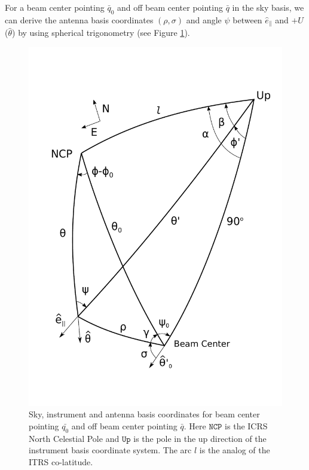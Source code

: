 \documentclass[a4paper,fleqn]{cas-dc}\sloppy
\newcommand{\co}{\mathbin{\|}}
\begin{document}
	For a beam center pointing $\bar{q}_0$ and off beam center pointing $\bar{q}$ in the sky basis, we can derive the antenna basis coordinates $(\rho,\sigma)$ and angle $\psi$ between $\hat{e}_{\co}$ and $+U$ ($\hat{\theta}$) by using spherical trigonometry (see Figure \ref{fig::figure10}). 
	
	\begin{figure}
		\centering
		\includegraphics[width=1.0\linewidth]{figures/Figure10.pdf}
		\caption{Sky, instrument and antenna basis coordinates for beam center pointing $\bar{q_0}$ and off beam center pointing $\bar{q}$. Here $\mathrm{\texttt{NCP}}$ is the ICRS North Celestial Pole and $\mathrm{\texttt{Up}}$ is the pole in the up direction of the instrument basis coordinate system. The arc $l$ is the analog of the ITRS co-latitude.}
		\label{fig::figure10}
	\end{figure}
	
\end{document}
